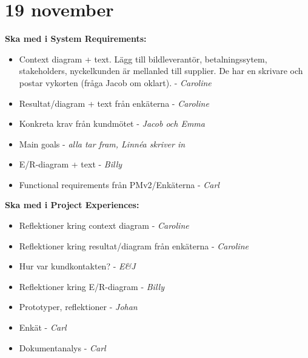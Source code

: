 \documentclass[10pt,a4paper]{article}
\author{Linnéa Claesson}
\begin{document}
\section*{19 november}
\textbf{Ska med i System Requirements:}
\begin{itemize}
\item Context diagram + text. Lägg till bildleverantör, betalningssytem, stakeholders, nyckelkunden är mellanled till supplier. De har en skrivare och postar vykorten (fråga Jacob om oklart). - \textit{Caroline}
\item Resultat/diagram + text från enkäterna - \textit{Caroline}
\item Konkreta krav från kundmötet - \textit{Jacob och Emma}
\item Main goals - \textit{alla tar fram, Linn\'ea skriver in}
\item E/R-diagram + text - \textit{Billy}
\item Functional requirements från PMv2/Enkäterna - \textit{Carl}

\end{itemize}

\textbf{Ska med i Project Experiences:}
\begin{itemize}
\item Reflektioner kring context diagram - \textit{Caroline}
\item Reflektioner kring resultat/diagram från enkäterna - \textit{Caroline}
\item Hur var kundkontakten? - \textit{E\&J}
\item Reflektioner kring E/R-diagram - \textit{Billy}
\item Prototyper, reflektioner - \textit{Johan}
\item Enkät - \textit{Carl}
\item Dokumentanalys - \textit{Carl}

\end{itemize}
\end{document}

